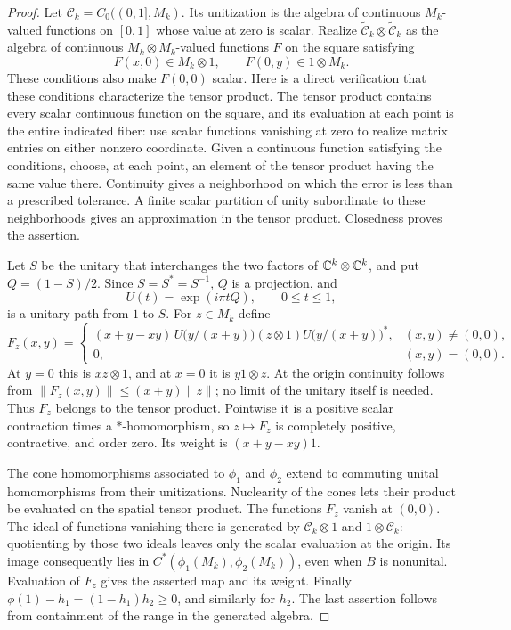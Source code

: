 \begin{proof}
Let $\mathcal C_k=C_0((0,1],M_k)$. Its unitization is the algebra of continuous
$M_k$-valued functions on $[0,1]$ whose value at zero is scalar.  Realize
$\widetilde{\mathcal C}_k\otimes\widetilde{\mathcal C}_k$ as the algebra of continuous
$M_k\otimes M_k$-valued functions $F$ on the square satisfying
\[
 F(x,0)\in M_k\otimes1,
 \qquad F(0,y)\in1\otimes M_k.
\]
These conditions also make $F(0,0)$ scalar.  Here is a direct verification
that these conditions characterize the tensor product.  The tensor
product contains every scalar continuous function on the square, and
its evaluation at each point is the entire indicated fiber: use scalar
functions vanishing at zero to realize matrix entries on either
nonzero coordinate.  Given a continuous function satisfying the
conditions, choose, at each point, an element of the tensor product
having the same value there.  Continuity gives a neighborhood on which
the error is less than a prescribed tolerance.  A finite scalar
partition of unity subordinate to these neighborhoods gives an
approximation in the tensor product.  Closedness proves the assertion.

Let $S$ be the unitary that interchanges the two factors of
$\mathbb C^k\otimes\mathbb C^k$, and put $Q=(1-S)/2$.  Since $S=S^*=S^{-1}$,
$Q$ is a projection, and
\[
 U(t)=\exp(i\pi tQ),\qquad 0\le t\le1,
\]
is a unitary path from $1$ to $S$.  For $z\in M_k$ define
\[
 F_z(x,y)=
 \begin{cases}
 (x+y-xy)\,U\bigl(y/(x+y)\bigr)(z\otimes1)
                 U\bigl(y/(x+y)\bigr)^*, &(x,y)\ne(0,0),\\
 0,&(x,y)=(0,0).
 \end{cases}
\]
At $y=0$ this is $xz\otimes1$, and at $x=0$ it is $y1\otimes z$.
At the origin continuity follows from
$\|F_z(x,y)\|\le(x+y)\|z\|$; no limit of the unitary itself is needed.
Thus $F_z$ belongs to the tensor product.  Pointwise it is a positive
scalar contraction times a $*$-homomorphism, so $z\mapsto F_z$ is
completely positive, contractive, and order zero.  Its weight is
$(x+y-xy)1$.

The cone homomorphisms associated to $\phi_1$ and $\phi_2$ extend to
commuting unital homomorphisms from their unitizations.  Nuclearity of
the cones lets their product be evaluated on the spatial tensor
product.  The functions $F_z$ vanish at $(0,0)$.  The ideal of functions
vanishing there is generated by $\mathcal C_k\otimes1$ and $1\otimes\mathcal C_k$:
quotienting by those two ideals leaves only the scalar evaluation at
the origin.  Its image consequently lies in
$C^*(\phi_1(M_k),\phi_2(M_k))$, even when $B$ is nonunital.  Evaluation
of $F_z$ gives the asserted map and its weight.  Finally
$\phi(1)-h_1=(1-h_1)h_2\ge0$, and similarly for $h_2$.
The last assertion follows from containment of the range in the
generated algebra.
\end{proof}

